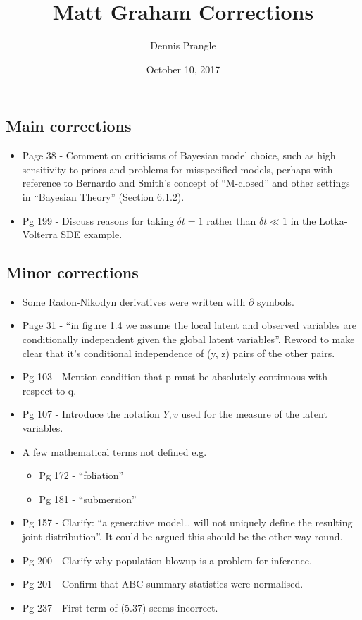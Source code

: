 \documentclass[]{article}
\title{Matt Graham Corrections}
\author{Dennis Prangle}
\date{October 10, 2017}
\providecommand{\tightlist}{%
  \setlength{\itemsep}{0pt}\setlength{\parskip}{0pt}}
\begin{document}
\maketitle

\subsection{Main corrections}\label{main-corrections}

\begin{itemize}
\tightlist
\item
  Page 38 - Comment on criticisms of Bayesian model choice, such as high
  sensitivity to priors and problems for misspecified models, perhaps
  with reference to Bernardo and Smith's concept of ``M-closed'' and
  other settings in ``Bayesian Theory'' (Section 6.1.2).
\item
  Pg 199 - Discuss reasons for taking \(\delta t = 1\) rather than
  \(\delta t \ll 1\) in the Lotka-Volterra SDE example.
\end{itemize}

\subsection{Minor corrections}\label{minor-corrections}

\begin{itemize}
\tightlist
\item
  Some Radon-Nikodyn derivatives were written with \(\partial\) symbols.
\item
  Page 31 - ``in figure 1.4 we assume the local latent and observed
  variables are conditionally independent given the global latent
  variables''. Reword to make clear that it's conditional independence
  of (y, z) pairs of the other pairs.
\item
  Pg 103 - Mention condition that p must be absolutely continuous with
  respect to q.
\item
  Pg 107 - Introduce the notation \(Y, v\) used for the measure of the
  latent variables.
\item
  A few mathematical terms not defined e.g.

  \begin{itemize}
  \tightlist
  \item
    Pg 172 - ``foliation''
  \item
    Pg 181 - ``submersion''
  \end{itemize}
\item
  Pg 157 - Clarify: ``a generative model\ldots{} will not uniquely
  define the resulting joint distribution''. It could be argued this
  should be the other way round.
\item
  Pg 200 - Clarify why population blowup is a problem for inference.
\item
  Pg 201 - Confirm that ABC summary statistics were normalised.
\item
  Pg 237 - First term of (5.37) seems incorrect.
\end{itemize}
\end{document}
